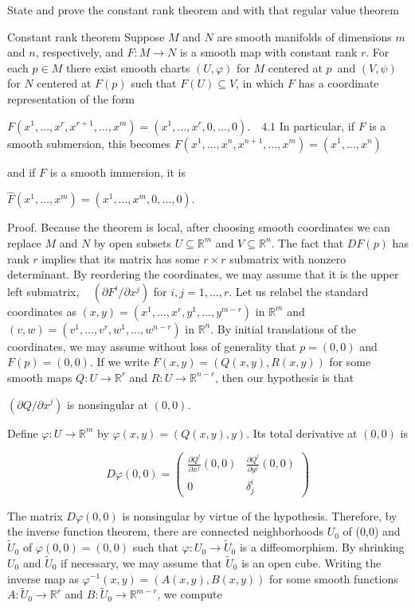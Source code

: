 State and prove the constant rank theorem and with that regular value theorem

Constant rank theorem
Suppose \( M \) and \( N \) are smooth manifolds of dimensions \( m \) and \( n \), respectively, and \( F:M\rightarrow N \) is a smooth map with constant rank \( r \). 
For each \( p\in M \) there exist smooth charts \((U, \varphi)\) for \( M \) centered at \( p \) and \((V, \psi)\) for \( N \) centered at \( F(p) \) such that \( F(U)\subseteq V \), in which \( F \) has a coordinate representation of the form 

\(F(x^{1},\dots,x^{r},x^{r+1},\dots,x^{m})=(x^{1},\dots,x^{r},0,\dots,0).\quad \text{4.1}\)
In particular, if \( F \) is a smooth submersion, this becomes 
\( F(x^{1},\dots,x^{n},x^{n+1},\dots,x^{m})=(x^{1},\dots,x^{n}) \)

and if \(F\) is a smooth immersion, it is 

\(\hat{F}(x^{1},\dots,x^{m})=(x^{1},\dots,x^{m},0,\dots,0).\)

Proof. Because the theorem is local, after choosing smooth coordinates we can replace \( M \) and \( N \) by open subsets \( U\subseteq\mathbb{R}^{m} \) and \(V\subseteq\mathbb{R}^{n}\). The fact that \(DF(p)\) has rank \(r\) implies that its matrix has some \(r\times r\) submatrix with nonzero determinant. 
By reordering the coordinates, we may assume that it is the upper left submatrix,   
\((\partial F^i / \partial x^j)\) for \(i,j=1,...,r\). Let us relabel the standard coordinates as \((x,y)= (x^{1},...,x^{r},y^{1},...,y^{m-r})\) in \(\mathbb{R}^{m}\) and 
\((v,w)=(v^{1},\dots,v^{r},w^{1},\dots,w^{n-r})\) in \(\mathbb{R}^{n}\). By initial translations of the coordinates, we may assume without loss of generality that \(p=(0,0)\) and \(F(p)=(0,0)\). If we write \(F(x,y)=(Q(x,y),R(x,y))\) for some smooth maps \(Q:U\rightarrow\mathbb{R}^{r}\) and \(R: U\rightarrow\mathbb{R}^{n-r}\), then our hypothesis is that   

\((\partial Q / \partial x^j)\) is nonsingular at \((0,0)\). 

Define \(\varphi: U \rightarrow \mathbb{R}^m\) by \(\varphi(x,y)=(Q(x,y),y)\). Its total derivative at \((0,0)\) is 

\[D\varphi(0,0)=
\begin{pmatrix}
\frac{\partial Q^{l}}{\partial x^{j}}(0,0) & \frac{\partial Q^{l}}{\partial y^{j}}(0,0) \\
0 & \delta_{j}^{i}
\end{pmatrix}
\] 

The matrix \(D\varphi(0,0)\) is nonsingular by virtue of the hypothesis. 
Therefore, by the inverse function theorem, there are connected neighborhoods \(U_{0}\) of (0,0) and \(\tilde{U}_{0}\) of \(\varphi(0,0)=(0,0)\) such that \(\varphi: U_0 \rightarrow \tilde{U}_0\) is a diffeomorphism. 
By shrinking \(U_{0}\) and \(\tilde{U}_{0}\) if necessary, we may assume that \(\tilde{U}_{0}\) is an open cube. 
Writing the inverse map as \(\varphi^{-1}(x,y)=(A(x,y),B(x,y))\) for some smooth functions 
\(A: \tilde{U}_0 \rightarrow \mathbb{R}^r\) and \(B:\tilde{U}_{0}\rightarrow\mathbb{R}^{m-r}\), we compute

